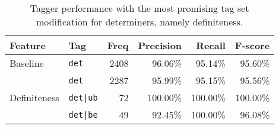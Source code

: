 \documentclass[a4paper,12pt,english]{book}
\begin{document}
\begin{table}
    \centering
    \smaller[0.5]
    \begin{tabular}{@{}llrrrr@{}}
        \toprule
        \textbf{Feature} & \textbf{Tag} & \textbf{Freq} & \textbf{Precision} &
        \textbf{Recall} & \textbf{F-score} \\
        \midrule
        Baseline & \texttt{det} & 2408 & 96.06\% & 95.14\% & 95.60\% \\
        \midrule
        \multirow{3}{*}{Definiteness}
        & \texttt{det} & 2287 & 95.99\% & 95.15\% & 95.56\% \\
        & \texttt{det|ub} & 72 & 100.00\% & 100.00\% & 100.00\% \\
        & \texttt{det|be} & 49 & 92.45\% & 100.00\% & 96.08\% \\
        \bottomrule
    \end{tabular}
    \caption{Tagger performance with the most promising tag set
        modification for determiners, namely definiteness.}
    \label{dettagerror}
\end{table}

\end{document}
